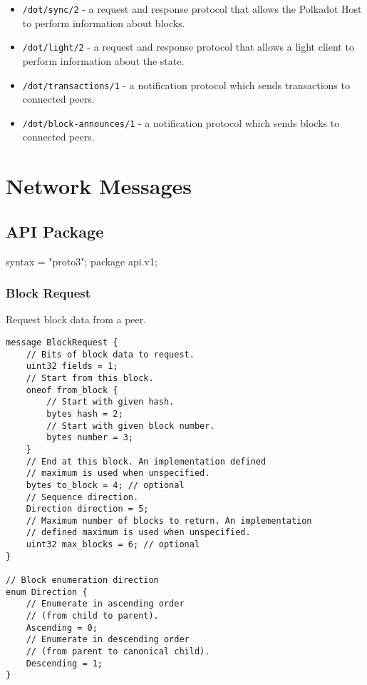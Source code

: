 \documentclass{book}
\begin{document}
\begin{itemize}
    \item \verb|/dot/sync/2| - a request and response protocol that
    allows the Polkadot Host to perform information about blocks.
    \item \verb|/dot/light/2| - a request and response protocol that
    allows a light client to perform information about the state.
    \item \verb|/dot/transactions/1| - a notification protocol which
    sends transactions to connected peers.
    \item \verb|/dot/block-announces/1| - a notification protocol
    which sends blocks to connected peers.
\end{itemize}

\section{Network Messages}

\subsection{API Package}

syntax = "proto3";
package api.v1;

\subsubsection{Block Request}

Request block data from a peer.

\begin{lstlisting}[frame=single]
message BlockRequest {
    // Bits of block data to request.
    uint32 fields = 1;
    // Start from this block.
    oneof from_block {
        // Start with given hash.
        bytes hash = 2;
        // Start with given block number.
        bytes number = 3;
    }
    // End at this block. An implementation defined
    // maximum is used when unspecified.
    bytes to_block = 4; // optional
    // Sequence direction.
    Direction direction = 5;
    // Maximum number of blocks to return. An implementation 
    // defined maximum is used when unspecified.
    uint32 max_blocks = 6; // optional
}

// Block enumeration direction
enum Direction {
    // Enumerate in ascending order
    // (from child to parent).
    Ascending = 0;
    // Enumerate in descending order 
    // (from parent to canonical child).
    Descending = 1;
}
\end{lstlisting}
\end{document}
